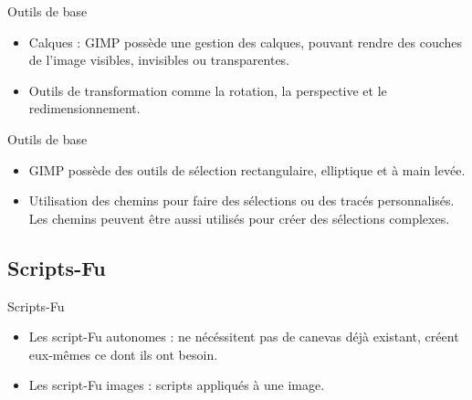 \documentclass[xcolor=x11names,compress]{beamer}
\renewcommand{\(}{\begin{columns}}
\renewcommand{\)}{\end{columns}}
\newcommand{\<}[1]{\begin{column}{#1}}
\renewcommand{\>}{\end{column}}
\begin{document}
\begin{frame}{Outils de base}
\begin{itemize}
\item Calques : GIMP possède une gestion des calques, pouvant rendre des couches de l'image visibles, invisibles ou transparentes.

\end{itemize}
\begin{itemize}
\item Outils de transformation comme la rotation, la perspective et le redimensionnement.

\end{itemize}
\end{frame}

\begin{frame}{Outils de base}

\begin{itemize}
\item GIMP possède des outils de sélection rectangulaire, elliptique et à main levée. 

\end{itemize}

\begin{itemize}
\item Utilisation des chemins pour faire des sélections ou des tracés personnalisés. Les chemins peuvent être aussi utilisés pour créer des sélections complexes.

\end{itemize}
\end{frame}

\subsection{Scripts-Fu}
\begin{frame}{Scripts-Fu}
\begin{itemize}
\item Les script-Fu autonomes : ne nécéssitent pas de canevas déjà existant, créent eux-mêmes ce dont ils ont besoin.
\end{itemize}
\begin{itemize}
\item Les script-Fu images : scripts appliqués à une image.
\end{itemize}
\end{frame}
\end{document}
